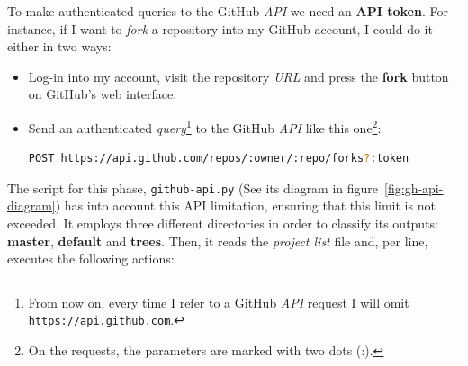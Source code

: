\documentclass[a4paper, 12pt]{book}
\begin{document}
To make authenticated queries to the GitHub \textit{API} we need an \textbf{API token}.
For instance, if I want to \textit{fork} a repository into my GitHub account, I could do it either in two ways:
\begin{itemize}
  \item Log-in into my account, visit the repository \emph{URL} and press the \textbf{fork} button on GitHub's web interface.
  \item Send an authenticated \textit{query}\footnote{From now on, every time I refer to a GitHub \textit{API}
  request I will omit \texttt{https://api.github.com}.}
  to the GitHub \textit{API} like this one\footnote{On the requests, the parameters are marked with two dots (:).}:
  \begin{lstlisting}[language=bash]
  POST https://api.github.com/repos/:owner/:repo/forks?:token \end{lstlisting}
\end{itemize}
The script for this phase, \texttt{github-api.py} (See its diagram in figure~\ref{fig:gh-api-diagram}) has into account
this API limitation, ensuring that this limit is not exceeded. It employs three different directories in order to classify its outputs:
\textbf{master}, \textbf{default} and \textbf{trees}.
Then, it reads the \emph{project list} file and, per line, executes the following actions:
\end{document}
